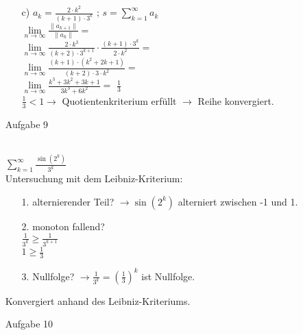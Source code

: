 \documentclass{scrreprt}
\begin{document}
\begin{enumerate}
{\begin{enumerate}
{                    $\lim \limits_{n \to \infty} \frac{2 ^ n}{(n+1)!} \cdot \frac{n!}{2 ^ {n-1}} = $\\
                    $\lim \limits_{n \to \infty} \frac{2}{n+1} = $
                    $0$\\
                    $0 < 1 \rightarrow$ Quotientenkriterium erfüllt $\rightarrow$ Reihe konvergiert.
                }
                \item[c)]{
                    $a_k=\frac{2\cdot k^2}{(k+1)\cdot 3 ^k}$ ; $s=\sum\limits_{k=1}^\infty a_k$\\
                    $\lim \limits_{n \to \infty} \frac{\|a_{k+1}\|}{\|a_k\|} = $\\
                    $\lim \limits_{n \to \infty} \frac{2\cdot k^3}{(k+2)\cdot 3 ^{k+1}} \cdot \frac{(k+1)\cdot 3 ^k}{2\cdot k^2} = $\\
                    $\lim \limits_{n \to \infty} \frac{(k+1)\cdot (k^2+2k+1)}{(k+2)\cdot 3 \cdot k^2} = $\\
                    $\lim \limits_{n \to \infty} \frac{k^3+3k^2+3k+1}{3k^3+6k^2} = $
                    $\frac{1}{3}$\\
                    $\frac{1}{3} < 1 \rightarrow$ Quotientenkriterium erfüllt $\rightarrow$ Reihe konvergiert.
                }
            \end{enumerate}
        }
        \item[Aufgabe 9]{\\
            $\sum\limits_{k=1}^\infty \frac{\sin(2^k)}{3^k}$\\
            Untersuchung mit dem Leibniz-Kriterium:\\
            \begin{enumerate}
                \item[1.]{
                    alternierender Teil? $\rightarrow \sin(2^k)$ alterniert zwischen -1 und 1. \checkmark
                }
                \item[2.]{
                    monoton fallend?\\ $\frac{1}{3^k} \geq \frac{1}{3^{k+1}}$\\$1\geq\frac{1}{3}$ \checkmark
                }
                \item[3.]{
                    Nullfolge? $\rightarrow \frac{1}{3^k} = (\frac{1}{3})^k$ ist Nullfolge.  \checkmark
                }
            \end{enumerate}
            Konvergiert anhand des Leibniz-Kriteriums.
        }
        \item[Aufgabe 10]{\\
}
\end{enumerate}
\end{document}
